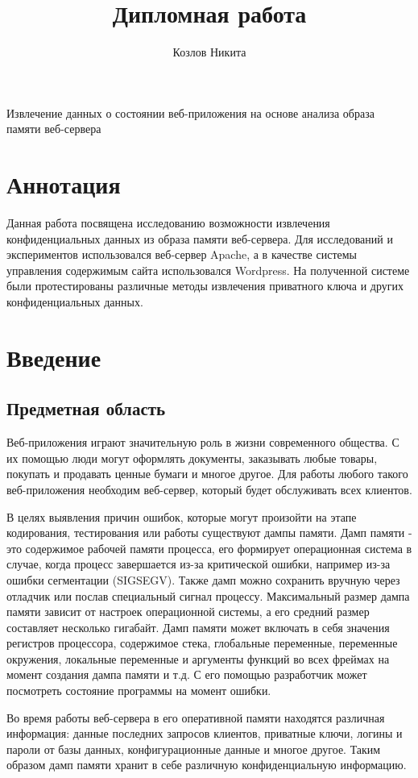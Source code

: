 \documentclass[20pt]{article}
\title{Дипломная работа}
\author{Козлов Никита}
\begin{document}
{\huge Извлечение данных о состоянии веб-приложения на основе анализа образа памяти веб-сервера}

\newpage

\section*{Аннотация}
Данная работа посвящена исследованию возможности извлечения конфиденциальных
данных из образа памяти веб-сервера. Для исследований и экспериментов
использовался веб-сервер Apache, а в качестве системы управления содержимым
сайта использовался Wordpress. На полученной системе были протестированы
различные методы извлечения приватного ключа и других конфиденциальных данных.

\newpage

\tableofcontents

\newpage

\section{Введение}

\subsection{Предметная область}
Веб-приложения играют значительную роль в жизни современного общества. С их
помощью люди могут оформлять документы, заказывать любые товары, покупать и
продавать ценные бумаги и многое другое. Для работы любого такого веб-приложения
необходим веб-сервер, который будет обслуживать всех клиентов.

В целях выявления причин ошибок, которые могут произойти на этапе кодирования,
тестирования или работы существуют дампы памяти. Дамп памяти\cite{wiki/coredump}
- это содержимое рабочей памяти процесса, его формирует операционная система в
случае, когда процесс завершается из-за критической ошибки, например из-за ошибки
сегментации (SIGSEGV). Также дамп можно сохранить вручную через отладчик или послав
специальный сигнал процессу. Максимальный размер дампа памяти зависит от
настроек операционной системы, а его средний размер составляет несколько
гигабайт. Дамп памяти может включать в себя значения регистров процессора,
содержимое стека, глобальные переменные, переменные окружения, локальные
переменные и аргументы функций во всех фреймах на момент создания дампа памяти
и т.д. С его помощью разработчик может посмотреть состояние программы на момент
ошибки.

Во время работы веб-сервера в его оперативной памяти находятся различная
информация: данные последних запросов клиентов, приватные ключи, логины и пароли
от базы данных, конфигурационные данные и многое другое. Таким образом дамп
памяти хранит в себе различную конфиденциальную информацию.
\end{document}
